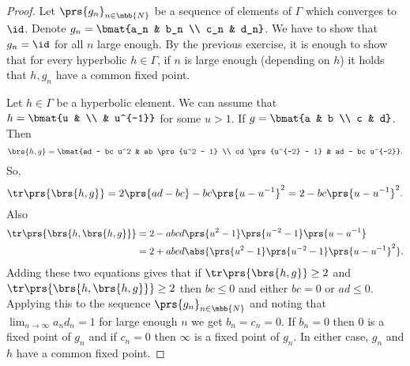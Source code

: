 \documentclass[10pt, twoside]{book}
\begin{document}
\begin{proof}
Let $\prs{g_n}_{n \in \mbb{N}}$ be a sequence of elements of $\Gamma$ which converges to $\id$. Denote $g_n = \bmat{a_n & b_n \\ c_n & d_n}$. We have to show that $g_n = \id$ for all $n$ large enough.
By the previous exercise, it is enough to show that for every hyperbolic $h \in \Gamma$, if $n$ is large enough (depending on $h$) it holds that $h, g_n$ have a common fixed point.

Let $h \in \Gamma$ be a hyperbolic element. We can assume that $h = \bmat{u & \\ & u^{-1}}$ for some $u > 1$. If $g = \bmat{a & b \\ c & d}$. Then
\[\brs{h,g} = \bmat{ad - bc u^2 & ab \prs{u^2 - 1} \\ cd \prs{u^{-2} - 1} & ad - bc u^{-2}} \text{.}\]
So,
\[\tr\prs{\brs{h,g}} = 2 \prs{ad - bc} - bc\prs{u - u^{-1}}^2 = 2 - bc \prs{u-u^{-1}}^2 \text{.}\]
Also
\begin{align*}
\tr\prs{\brs{h, \brs{h,g}}} &= 2 - abcd \prs{u^2 - 1}\prs{u^{-2} - 1}\prs{u - u^{-1}}
\\&=
2 + abcd \abs{\prs{u^2 - 1}\prs{u^{-2} - 1}\prs{u - u^{-1}}^2} \text{.}
\end{align*}
Adding these two equations gives that if $\tr\prs{\brs{h,g}} \geq 2$ and $\tr\prs{\brs{h,\brs{h,g}}} \geq 2$ then $bc \leq 0$ and either $bc = 0$ or $ad \leq 0$.
Applying this to the sequence $\prs{g_n}_{n \in \mbb{N}}$ and noting that $\lim_{n \to \infty} a_n d_n = 1$ for large enough $n$ we get $b_n = c_n = 0$. If $b_n = 0$ then $0$ is a fixed point of $g_n$ and if $c_n = 0$ then $\infty$ is a fixed point of $g_n$. In either case, $g_n$ and $h$ have a common fixed point.
\end{proof}
\end{document}
